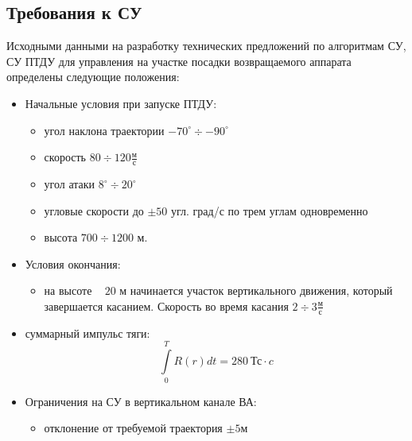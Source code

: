 \clearpage

\subsection{Требования к СУ}
Исходными данными на разработку технических предложений по алгоритмам СУ, СУ ПТДУ для управления на участке посадки возвращаемого аппарата определены следующие положения:
\begin{itemize}
	\item Начальные условия при запуске ПТДУ:
	\begin{itemize}
		\item угол наклона траектории $-70^{\circ} \div -90^{\circ}$
		\item скорость $80 \div 120 \frac{\text{м}}{\text{с}}$
		\item угол атаки $8^{\circ} \div 20^{\circ} $
		\item угловые скорости до $\pm 50$ угл. град/с по трем углам одновременно
		\item высота $700 \div 1200$ м.
	\end{itemize}
	\item Условия окончания:
	\begin{itemize}
		\item на высоте ~ $20$ м начинается участок вертикального движения, который завершается касанием. Скорость во время касания $2 \div 3 \frac{\text{м}}{\text{с}}$
	\end{itemize}
	\item суммарный импульс тяги:
	$$\int \limits_{0}^T R(r) dt = 280 \ \text{Тс} \cdot c$$
	\item Ограничения на СУ в вертикальном канале ВА:
	\begin{itemize}
		\item отклонение от требуемой траектория $\pm 5 \text{м}$
	\end{itemize}
\end{itemize}
\clearpage